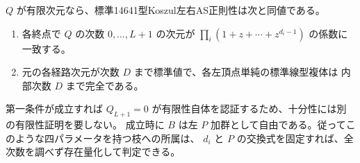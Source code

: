 \begin{theorem}\label{thm:onesided-parameter-cutoff}
$Q$ が有限次元なら、標準14641型Koszul左右AS正則性は次と同値である。
\begin{enumerate}
\item 各終点で $Q$ の次数 $0,\ldots,L+1$ の次元が
$\prod_i(1+z+\cdots+z^{d_i-1})$ の係数に一致する。
\item 元の各経路次元が次数 $D$ まで標準値で、各左頂点単純の標準線型複体は
内部次数 $D$ まで完全である。
\end{enumerate}
第一条件が成立すれば $Q_{L+1}=0$ が有限性自体を認証するため、十分性には別の有限性証明を要しない。
成立時に $B$ は左 $P$ 加群として自由である。従ってこのような四パラメータを持つ枝への所属は、
$d_i$ と $P$ の交換式を固定すれば、全次数を調べず存在量化して判定できる。
\end{theorem}
